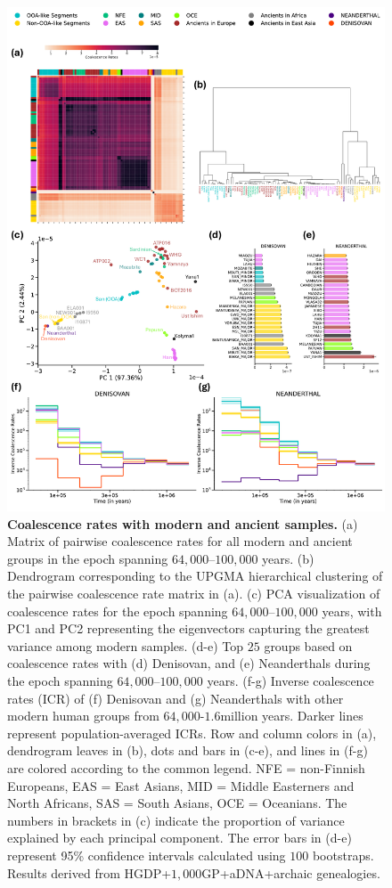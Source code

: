 \begin{figure}
    \centering
    \includegraphics[width=\linewidth]{figures/gb_deepadmix/gb_real_deep_12.pdf}
    \captionsetup{width=\textwidth+3cm}
    \caption{
    \footnotesize
    \textbf{Coalescence rates with modern and ancient samples.} (a) Matrix of pairwise coalescence rates for all modern and ancient groups in the epoch spanning $64{,}000$–$100{,}000$ years. (b) Dendrogram corresponding to the UPGMA hierarchical clustering of the pairwise coalescence rate matrix in (a). (c) PCA visualization of coalescence rates for the epoch spanning $64{,}000$–$100{,}000$ years, with PC1 and PC2 representing the eigenvectors capturing the greatest variance among modern samples. (d-e) Top $25$ groups based on coalescence rates with (d) Denisovan, and (e) Neanderthals during the epoch spanning $64{,}000$–$100{,}000$ years. (f-g) Inverse coalescence rates (ICR) of (f) Denisovan and (g) Neanderthals with other modern human groups from $64{,}000$-$1.6$million years. Darker lines represent population-averaged ICRs.  Row and column colors in (a), dendrogram leaves in (b), dots and bars in (c-e), and lines in (f-g) are colored according to the common legend. NFE = non-Finnish Europeans, EAS = East Asians, MID = Middle Easterners and North Africans, SAS = South Asians, OCE = Oceanians. The numbers in brackets in (c) indicate the proportion of variance explained by each principal component. The error bars in (d-e) represent 95\% confidence intervals calculated using $100$ bootstraps. Results derived from HGDP+$1{,}000$GP+aDNA+archaic genealogies.
    }
\label{fig:gb-deepadmix-source}
\end{figure}


